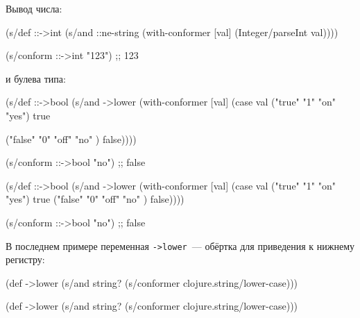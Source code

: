 \noindent

Вывод числа:

\begin{english}
  \begin{clojure}
(s/def ::->int
  (s/and
    ::ne-string
    (with-conformer [val]
      (Integer/parseInt val))))

(s/conform ::->int "123")
;; 123
  \end{clojure}
\end{english}

\noindent
и булева типа:

\ifx\DEVICETYPE\MOBILE

\begin{english}
  \begin{clojure}
(s/def ::->bool
  (s/and
   ->lower
   (with-conformer [val]
     (case val
       ("true"  "1" "on"  "yes")
       true

       ("false" "0" "off" "no" )
       false))))

(s/conform ::->bool "no")
;; false
  \end{clojure}
\end{english}

\else

\begin{english}
  \begin{clojure}
(s/def ::->bool
  (s/and
   ->lower
   (with-conformer [val]
     (case val
       ("true"  "1" "on"  "yes") true
       ("false" "0" "off" "no" ) false))))

(s/conform ::->bool "no")
;; false
  \end{clojure}
\end{english}

\fi

\noindent
В последнем примере переменная \verb|->lower|~--- обёртка для приведения к
нижнему регистру:

\ifx\DEVICETYPE\MOBILE

\begin{english}
  \begin{clojure}
(def ->lower
  (s/and
    string?
    (s/conformer
      clojure.string/lower-case)))
  \end{clojure}
\end{english}
\else

\begin{english}
  \begin{clojure}
(def ->lower
  (s/and
    string?
    (s/conformer clojure.string/lower-case)))
  \end{clojure}
\end{english}

